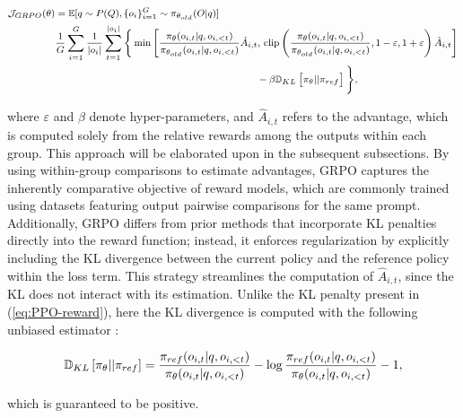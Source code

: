 \begin{itemize}[topsep=0pt]
\begin{itemize}[topsep=0pt]
\begin{equation}
\footnotesize
\begin{split}
    \mathcal{J}_{GRPO}(\theta) &= \mathbb{E}{[q \sim P(Q), \{o_i\}_{i=1}^G \sim \pi_{\theta_{old}}(O|q)]}  \\
    & \frac{1}{G}\sum_{i=1}^G\frac{1}{|o_i|} \sum_{t=1}^{|o_i|} \Bigg\{ \min \left[ \frac{\pi_\theta(o_{i,t} | q, o_{i,<t})}{\pi_{\theta_{old}}(o_{i,t} | q, o_{i,<t})} \hat{A}_{i,t},\, \text{clip} \left( \frac{\pi_\theta(o_{i,t} | q, o_{i,<t})}{\pi_{\theta_{old}}(o_{i,t} | q, o_{i,<t})}, 1 - \varepsilon, 1 + \varepsilon \right)  \hat{A}_{i,t} \right] \\
    & \hspace{6cm} - \beta \mathbb{D}_{KL}\left[\pi_{\theta} || \pi_{ref}\right]\Bigg\} ,
\end{split}
\label{eq:GRPO-obj}
\end{equation}

where $\varepsilon$ and $\beta$ denote hyper-parameters, and $\hat{A}_{i,t}$ refers to the advantage, which is computed solely from the relative rewards among the outputs within each group. This approach will be elaborated upon in the subsequent subsections. By using within-group comparisons to estimate advantages, GRPO captures the inherently comparative objective of reward models, which are commonly trained using datasets featuring output pairwise comparisons for the same prompt. Additionally, GRPO differs from prior methods that incorporate KL penalties directly into the reward function; instead, it enforces regularization by explicitly including the KL divergence between the current policy and the reference policy within the loss term. This strategy streamlines the computation of $\hat{A}_{i,t}$, since the KL does not interact with its estimation. Unlike the KL penalty present in (\ref{eq:PPO-reward}), here the KL divergence is computed with the following unbiased estimator \citep{kl_approx}:

\begin{equation}
\small
    \mathbb{D}_{KL}\left[\pi_{\theta} || \pi_{ref}\right] = \frac{\pi_{ref}(o_{i,t}|q,o_{i,<t})}{\pi_{\theta}(o_{i,t}|q,o_{i,<t})}- \log\frac{\pi_{ref}(o_{i,t}|q,o_{i,<t})}{\pi_{\theta}(o_{i,t}|q,o_{i,<t})} - 1,
\end{equation}

which is guaranteed to be positive.


\end{itemize}
\end{itemize}
